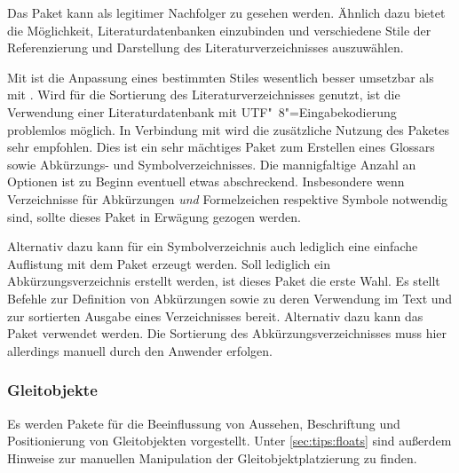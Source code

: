 \begin{DeclarePackages}[Verzeichnisse|?]
  Das Paket kann als legitimer Nachfolger zu  gesehen werden. 
  Ähnlich dazu bietet  die Möglichkeit, Literaturdatenbanken 
  einzubinden und verschiedene Stile der Referenzierung und Darstellung des 
  Literaturverzeichnisses auszuwählen. 
  
  Mit  ist die Anpassung eines bestimmten Stiles wesentlich 
  besser umsetzbar als mit . Wird  für die 
  Sortierung des Literaturverzeichnisses genutzt, ist die Verwendung einer 
  Literaturdatenbank mit UTF"~8"=Eingabekodierung problemlos möglich. In 
  Verbindung mit  wird die zusätzliche Nutzung des Paketes 
   sehr empfohlen.
  Dies ist ein sehr mächtiges Paket zum Erstellen eines Glossars sowie 
  Abkürzungs- und Symbolverzeichnisses. Die mannigfaltige Anzahl an Optionen 
  ist zu Beginn eventuell etwas abschreckend. Insbesondere wenn Verzeichnisse 
  für Abkürzungen \emph{und} Formelzeichen respektive Symbole notwendig sind, 
  sollte dieses Paket in Erwägung gezogen werden.
  
  Alternativ dazu kann für ein Symbolverzeichnis auch lediglich eine einfache 
  Auflistung mit dem Paket  erzeugt werden.
  Soll lediglich ein Abkürzungsverzeichnis erstellt werden, ist dieses Paket 
  die erste Wahl. Es stellt Befehle zur Definition von Abkürzungen sowie zu 
  deren Verwendung im Text und zur sortierten Ausgabe eines Verzeichnisses 
  bereit. Alternativ dazu kann das Paket  verwendet werden. 
  Die Sortierung des Abkürzungsverzeichnisses muss hier allerdings manuell 
  durch den Anwender erfolgen.
\end{DeclarePackages}



\subsubsection{%
  Gleitobjekte%
}

Es werden Pakete für die Beeinflussung von Aussehen, Beschriftung und 
Positionierung von Gleitobjekten vorgestellt. Unter \autoref{sec:tips:floats} 
sind außerdem Hinweise zur manuellen Manipulation der Gleitobjektplatzierung zu 
finden.


